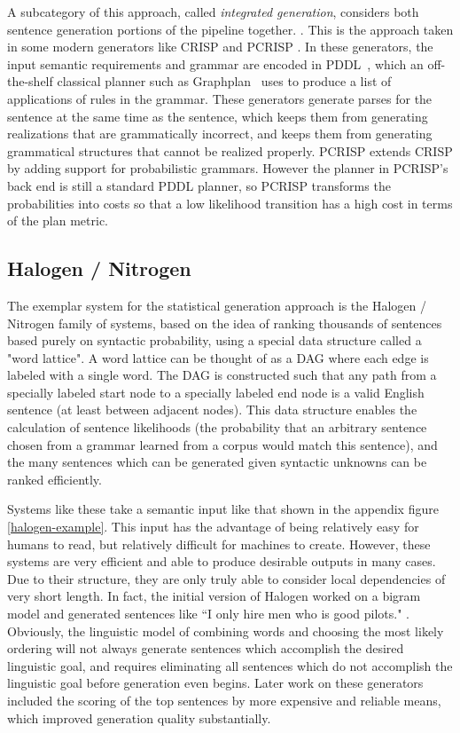 A subcategory of this approach, called {\em integrated generation}, considers both
sentence generation portions of the pipeline together.
\cite{koller_sentence_2007}.  This is the approach taken in some
modern generators like CRISP \cite{koller_sentence_2007} and PCRISP
\cite{bauer_sentence_2010}.  In these generators, the input semantic
requirements and grammar are encoded in PDDL~\cite{fox2003pddl2},
which an off-the-shelf classical planner such as
Graphplan~\cite{blum_1997_graphplan} uses to produce a list of
applications of rules in the grammar.  These generators generate
parses for the sentence at the same time as the sentence, which keeps
them from generating realizations that are grammatically incorrect,
and keeps them from generating grammatical structures that cannot be
realized properly. PCRISP extends CRISP by adding support for
probabilistic grammars. However the planner in PCRISP's back end is
still a standard PDDL planner, so PCRISP transforms the probabilities
into costs so that a low likelihood transition has a high cost in
terms of the plan metric.

\subsection{Halogen / Nitrogen}

The exemplar system for the statistical generation approach is the
Halogen / Nitrogen family of systems, based on the idea of
ranking thousands of sentences based purely on syntactic probability,
using a special data structure called a "word lattice".
A word lattice can be thought of as a DAG where each edge is
labeled with a single word.  The DAG is constructed such that
any path from a specially labeled start node to a specially labeled
end node is a valid English sentence (at least between adjacent nodes).
This data structure enables the calculation of sentence likelihoods
(the probability that an arbitrary sentence chosen from a grammar
learned from a corpus would match this sentence), and the many
sentences which can be generated
given syntactic unknowns can be ranked efficiently.

Systems like these take a semantic input like that shown in
the appendix figure \ref{halogen-example}.  This input
has the advantage of being relatively easy for humans to
read, but relatively difficult for machines to create.
However, these systems are very efficient and able
to produce desirable outputs in many cases.  Due to
their structure, they are only truly able to consider local
dependencies of very short length.  In fact, the
initial version of Halogen worked on a bigram model
and generated sentences like ``I only hire men who is good 
pilots." \cite{knight_1995_genselect}.  Obviously, the
linguistic model of combining words and choosing the most likely
ordering will not always generate sentences which accomplish
the desired linguistic goal, and requires eliminating all
sentences which do not accomplish the linguistic goal
before generation even begins.  Later work on these
generators included the scoring of the top
sentences by more expensive and reliable means, which
improved generation quality substantially. \cite{langkilde1998generation}

